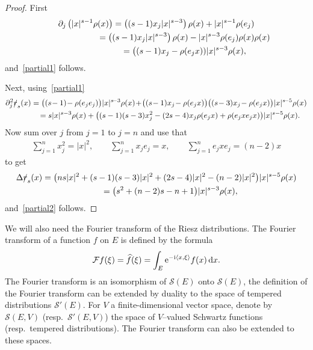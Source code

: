 \documentclass[10pt,a4paper]{amsart}
\newcommand{\fsl}[1]{{\slashed{#1}}} %
\numberwithin{equation}{section}
\begin{document}
\begin{proof} First
\begin{gather*}
\partial_j \left(\vert x\vert^{s-1} \rho(x)\right) = \left((s-1) x_j \vert x\vert^{s-3}\right)\rho(x)+ \vert x\vert^{s-1} \rho(e_j)
\\ \hphantom{\partial_j \left(\vert x\vert^{s-1} \rho(x)\right) }
{}= \left((s-1) x_j \vert x\vert^{s-3}\right)\rho(x) - \vert x\vert^{s-3} \rho(e_j)\rho(x) \rho(x)
\\ \hphantom{\partial_j \left(\vert x\vert^{s-1} \rho(x)\right) }
{}= \big((s-1)x_j-\rho(e_jx)) \vert x\vert^{s-3}\rho(x) ,
\end{gather*}
and~\eqref{partial1} follows.

Next, using~\eqref{partial1}
\begin{gather*}
\partial_j^2\fsl{r}_s(x) = \big((s\!-1)\!-\rho(e_je_j)\big) \vert x\vert^{s\!-3}\rho(x)
\!+\!\big((s\!-1)x_j\!-\rho(e_jx)\big) \big((s\!-3) x_j\!-\rho(e_jx)\big) \vert x\vert^{s\!-5} \rho(x)
\\ \hphantom{\partial_j^2\fsl{r}_s(x)}
{}= s\vert x \vert^{s-3} \rho(x) + \big( (s-1)(s-3) x_j^2 -(2s-4)x_j\rho(e_jx)+\rho(e_jxe_jx)\big)\vert x\vert^{s-5}\rho(x) .
\end{gather*}
Now sum over $j$ from $j=1$ to $j=n$ and use that
\begin{gather*}
\sum_{j=1}^n x_j^2 = \vert x\vert^2, \qquad
\sum_{j=1}^n x_je_j = x,\qquad
\sum_{j=1}^n e_jxe_j = (n-2) x
\end{gather*}
to get
\begin{gather*}
\Delta \fsl{r}_s(x) = \big(ns\vert x \vert^2+(s-1)(s-3) \vert x\vert^2+(2s-4)\vert x\vert^2-(n-2) \vert x\vert^2\big)\vert x \vert^{s-5}\rho(x)
\\ \hphantom{\Delta \fsl{r}_s(x)}
{}=\big(s^2+(n-2)s-n+1\big) \vert x\vert^{s-3}\rho(x) ,
\end{gather*}
and~\eqref{partial2} follows.
\end{proof}

We will also need the Fourier transform of the Riesz distributions. The Fourier transform of a function $f$ on $E$ is defined by the formula
\begin{gather*}
\mathcal Ff(\xi) = \widehat f(\xi) = \int_E {\rm e}^{-{\rm i}\langle x,\xi\rangle} f(x)\,{\rm d}x.
\end{gather*}
The Fourier transform is an isomorphism of $\mathcal S(E)$ onto $\mathcal S(E)$, the definition of the Fourier transform can be extended by duality to the space of tempered distributions $\mathcal S'(E)$. For $V$ a
 finite-dimensional vector space, denote by $\mathcal S(E,V)$ (resp.~$\mathcal S'(E, V)$) the space of
 $V$--valued Schwartz functions (resp.~tempered distributions). The Fourier transform can also be extended to these spaces.
\end{document}
